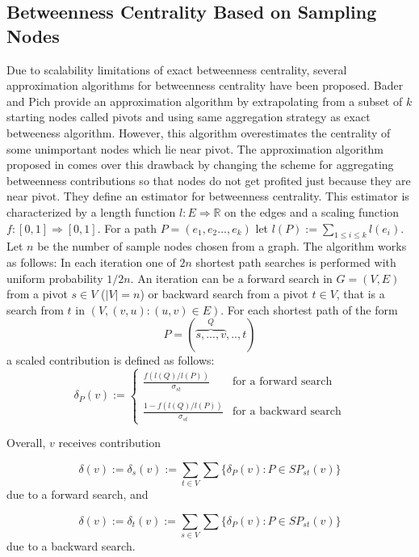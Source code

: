 \documentclass[runningheads,a4paper]{llncs}
\begin{document}
\subsection*{Betweenness Centrality Based on Sampling Nodes}
Due to scalability limitations of exact betweenness centrality, several approximation algorithms for betweenness centrality have been proposed. Bader and Pich\cite{bp} provide an approximation algorithm by extrapolating from a subset of $k$ starting nodes called pivots and using same aggregation strategy as exact betweeness algorithm. However, this algorithm overestimates the centrality of some unimportant nodes which lie near pivot. The approximation algorithm proposed in \cite{sanders} comes over this drawback by changing the scheme for aggregating betweenness contributions so that nodes do not get profited just because they are near pivot. They define an estimator for betweenness centrality. This estimator is characterized by a length function $l : E \Rightarrow \mathbb{R}$ on the edges and a scaling function $f : [0,1] \Rightarrow [0,1]$. For a path $P = (e_{1},e_{2}...,e_{k})$ let $l(P) := \sum_{1 \leq i \leq k} l(e_{i})$. Let $n$ be the number of sample nodes chosen from a graph. The algorithm works as follows: In each iteration one of $2n$ shortest path searches is performed with uniform probability $1/2n$. An iteration can be a forward search in $G = (V,E)$ from a pivot $s \in V$ ($|V| = n$) or backward search from a pivot $t \in V$, that is a search from $t$ in $(V,{(v,u) : (u,v) \in E})$. For each shortest path of the form 
$$ P = (\overbrace{s,...,v}^{Q},..,t)$$ 
a scaled contribution is defined as follows:\\

\begin{equation*}
	\delta_{P}(v) := \begin{cases}
					\frac{f(l(Q)/l(P))}{\sigma_{st}} & \text{for a forward search} \\\\
					\frac{1 - f(l(Q)/l(P))}{\sigma_{st}} & \text{for a backward search} 
					\end{cases}
\end{equation*}

Overall, $v$ receives contribution 

$$\delta(v) := \delta_{s}(v) := \sum_{t \in V}\sum \{\delta_{P}(v):  P \in SP_{st}(v)\}$$
due to a forward search, and 

$$\delta(v) := \delta_{t}(v) := \sum_{s \in V}\sum \{\delta_{P}(v):  P \in SP_{st}(v)\}$$
due to a backward search. 
\end{document}
